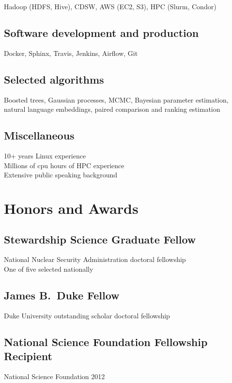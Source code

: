 \documentclass[letterpaper,10pt]{article}
\begin{document}
\begin{multicols}{2}
Hadoop (HDFS, Hive), CDSW, AWS (EC2, S3), HPC (Slurm, Condor)

\subsection{Software development and production}
\smallskip

Docker, Sphinx, Travis, Jenkins, Airflow, Git

\subsection{Selected algorithms}
\smallskip

Boosted trees, Gaussian processes, MCMC, Bayesian parameter estimation, natural
language embeddings, paired comparison and ranking estimation

\subsection{Miscellaneous}
\smallskip

10+ years Linux experience\\
Millions of cpu hours of HPC experience\\
Extensive public speaking background

\section{Honors and Awards}

\subsection{Stewardship Science Graduate Fellow}

National Nuclear Security Administration doctoral fellowship\\
One of five selected nationally

\subsection{James B.\ Duke Fellow}

Duke University outstanding scholar doctoral fellowship

\subsection{National Science Foundation Fellowship Recipient}
{\small National Science Foundation \hfill 2012}


\end{multicols}
\end{document}
